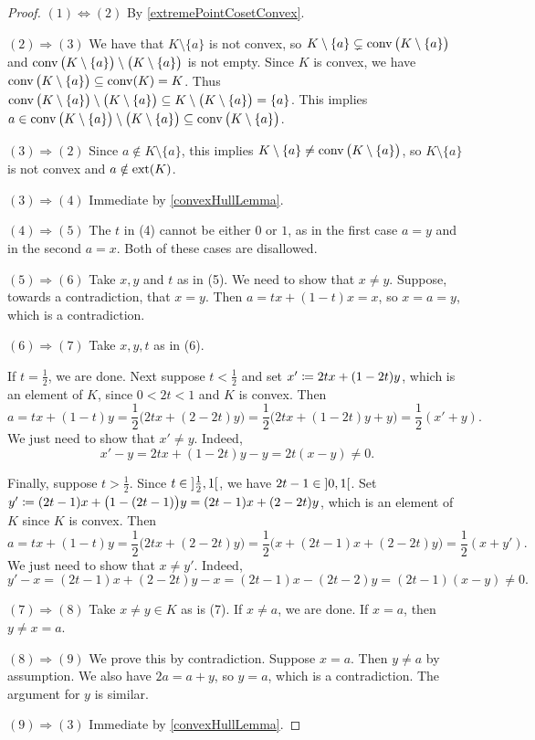 \begin{proof}
$(1) \Leftrightarrow (2)$ By \ref{extremePointCosetConvex}.

$(2) \Rightarrow (3)$ We have that $K\setminus\{a\}$ is not convex, so $K\setminus \{a\} \subsetneq \operatorname{conv}\big(K\setminus \{a\}\big)$ and $\operatorname{conv}\big(K\setminus \{a\}\big) \setminus \big(K\setminus\{a\}\big)$ is not empty. Since $K$ is convex, we have $\operatorname{conv}\big(K\setminus \{a\}\big) \subseteq \operatorname{conv}(K) = K$. Thus $\operatorname{conv}\big(K\setminus \{a\}\big) \setminus \big(K\setminus\{a\}\big) \subseteq K \setminus\big(K\setminus \{a\}\big) = \{a\}$. This implies $a \in \operatorname{conv}\big(K\setminus \{a\}\big) \setminus \big(K\setminus\{a\}\big) \subseteq \operatorname{conv}\big(K\setminus \{a\}\big)$.

$(3) \Rightarrow (2)$ Since $a\notin K\setminus \{a\}$, this implies $K\setminus\{a\} \neq \operatorname{conv}\big(K\setminus \{a\}\big)$, so $K\setminus\{a\}$ is not convex and $a\notin \operatorname{ext}(K)$.

$(3) \Rightarrow (4)$ Immediate by \ref{convexHullLemma}.

$(4) \Rightarrow (5)$ The $t$ in (4) cannot be either $0$ or $1$, as in the first case $a = y$ and in the second $a = x$. Both of these cases are disallowed.

$(5) \Rightarrow (6)$ Take $x,y$ and $t$ as in (5). We need to show that $x\neq y$. Suppose, towards a contradiction, that $x=y$. Then $a = tx + (1-t)x = x$, so $x=a=y$, which is a contradiction.

$(6) \Rightarrow (7)$ Take $x,y,t$ as in (6). 

If $t = \frac{1}{2}$, we are done. Next suppose $t<\frac{1}{2}$ and set $x' \coloneqq 2tx + (1-2t)y$, which is an element of $K$, since $0<2t<1$ and $K$ is convex. Then
\[ a = tx + (1-t)y = \frac{1}{2}\big(2tx + (2-2t)y\big) = \frac{1}{2}\big(2tx + (1-2t)y + y\big) = \frac{1}{2}(x' + y). \]
We just need to show that $x' \neq y$. Indeed,
\[ x' - y = 2tx + (1-2t)y - y = 2t(x-y) \neq 0. \]

Finally, suppose $t>\frac{1}{2}$. Since $t\in \interval[o]{\frac{1}{2}, 1}$, we have $2t-1 \in \interval[o]{0, 1}$. Set $y'\coloneqq (2t-1)x + \big(1-(2t-1)\big)y= (2t-1)x + (2-2t)y$, which is an element of $K$ since $K$ is convex. Then
\[ a = tx + (1-t)y = \frac{1}{2}\big(2tx + (2-2t)y\big) = \frac{1}{2}\big(x + (2t-1)x + (2-2t)y\big) = \frac{1}{2}(x+y'). \]
We just need to show that $x \neq y'$. Indeed,
\[ y' - x = (2t-1)x + (2-2t)y - x = (2t-1)x - (2t-2)y = (2t-1)(x-y) \neq 0. \]

$(7) \Rightarrow (8)$ Take $x \neq y\in K$ as is (7).  If $x\neq a$, we are done. If $x=a$, then $y \neq x=a$. 

$(8) \Rightarrow (9)$ We prove this by contradiction. Suppose $x = a$. Then $y \neq a$ by assumption. We also have $2a = a+y$, so $y=a$, which is a contradiction. The argument for $y$ is similar.


$(9) \Rightarrow (3)$ Immediate by \ref{convexHullLemma}.
\end{proof}

